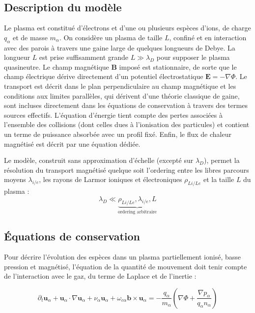 \begin{refsection}
\section{Description du modèle}
Le plasma est constitué d'électrons et d'une ou plusieurs espèces d'ions, de
charge $q_\alpha$ et de masse $m_\alpha$. On considère un plasma de taille $L$,
confiné et en interaction avec des parois à travers une gaine large de quelques longueurs
de Debye. La longueur $L$ est prise suffisamment grande $L\gg\lambda_D$ pour
supposer le plasma quasineutre. Le champ magnétique $\mathbf{B}$ imposé est 
stationnaire, de sorte que le champ électrique dérive directement d'un 
potentiel électrostatique $\mathbf{E}=-\nabla \Phi$. Le transport est décrit
dans le plan perpendiculaire au champ magnétique et les conditions aux limites
parallèles, qui dérivent d'une théorie classique de gaine, sont
incluses directement dans les équations de conservation à travers des termes
sources effectifs. L'équation d'énergie tient compte des pertes
associées à l'ensemble des collisions (dont celles dues à l'ionisation des particules) et
contient un terme de puissance
absorbée avec un profil fixé. Enfin, le flux de chaleur magnétisé
est décrit par une équation dédiée.

Le modèle, construit sans approximation d'échelle (excepté sur $\lambda_D$),
permet la résolution du transport magnétisé quelque soit l'ordering entre les
libres parcours moyens $\lambda_{{i/e}}$, les rayons de Larmor ioniques et
électroniques $\rho_{L{i/Le}}$ et la taille $L$ du plasma :
\begin{equation}
\lambda_D\ll\underbrace{\rho_{L{i/Le}},\lambda_{{i/e}},L}_\text{ordering
arbitraire}
\end{equation}

\subsection{Équations de conservation}
Pour décrire l'évolution des espèces dans un plasma partiellement ionisé, basse
pression et magnétisé, l'équation de la quantité de mouvement doit tenir compte
de l'interaction avec le gaz, du terme de Laplace et de l'inertie :

\begin{equation}
\label{3-eqMouvement}
\partial_t \mathbf{u}_\alpha + \mathbf{u}_\alpha\cdot\nabla\mathbf{u}_\alpha+
\nu_\alpha\mathbf{u}_\alpha+\omega_{c\alpha}\mathbf{b}\times\mathbf{u}_\alpha=
-\frac{q_\alpha}{m_\alpha}\left(\nabla \Phi+\frac{\nabla
p_\alpha}{q_\alpha n_\alpha}\right)
\end{equation}


\end{refsection}

